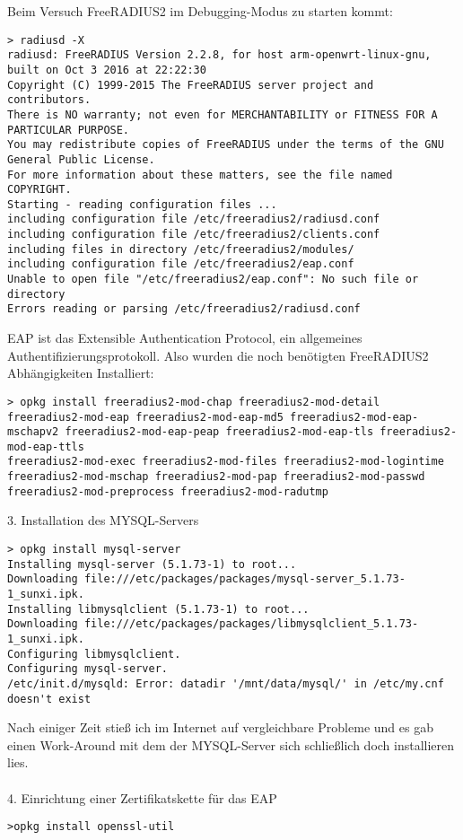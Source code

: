 Beim Versuch FreeRADIUS2 im Debugging-Modus zu starten kommt:\
\begin{lstlisting}
> radiusd -X
radiusd: FreeRADIUS Version 2.2.8, for host arm-openwrt-linux-gnu, built on Oct 3 2016 at 22:22:30
Copyright (C) 1999-2015 The FreeRADIUS server project and contributors.
There is NO warranty; not even for MERCHANTABILITY or FITNESS FOR A PARTICULAR PURPOSE.
You may redistribute copies of FreeRADIUS under the terms of the GNU General Public License.
For more information about these matters, see the file named COPYRIGHT.
Starting - reading configuration files ...
including configuration file /etc/freeradius2/radiusd.conf
including configuration file /etc/freeradius2/clients.conf
including files in directory /etc/freeradius2/modules/
including configuration file /etc/freeradius2/eap.conf
Unable to open file "/etc/freeradius2/eap.conf": No such file or directory
Errors reading or parsing /etc/freeradius2/radiusd.conf
\end{lstlisting}
EAP ist das Extensible Authentication Protocol, ein allgemeines Authentifizierungsprotokoll. Also
wurden die noch benötigten FreeRADIUS2 Abhängigkeiten Installiert:
\begin{lstlisting}
> opkg install freeradius2-mod-chap freeradius2-mod-detail freeradius2-mod-eap freeradius2-mod-eap-md5 freeradius2-mod-eap-mschapv2 freeradius2-mod-eap-peap freeradius2-mod-eap-tls freeradius2-mod-eap-ttls
freeradius2-mod-exec freeradius2-mod-files freeradius2-mod-logintime
freeradius2-mod-mschap freeradius2-mod-pap freeradius2-mod-passwd
freeradius2-mod-preprocess freeradius2-mod-radutmp
\end{lstlisting}
3. Installation des MYSQL-Servers
\begin{lstlisting}
> opkg install mysql-server
Installing mysql-server (5.1.73-1) to root...
Downloading file:///etc/packages/packages/mysql-server_5.1.73-1_sunxi.ipk.
Installing libmysqlclient (5.1.73-1) to root...
Downloading file:///etc/packages/packages/libmysqlclient_5.1.73-1_sunxi.ipk.
Configuring libmysqlclient.
Configuring mysql-server.
/etc/init.d/mysqld: Error: datadir '/mnt/data/mysql/' in /etc/my.cnf
doesn't exist
\end{lstlisting}
Nach einiger Zeit stieß ich im Internet auf vergleichbare Probleme und es gab einen Work-Around
mit dem der MYSQL-Server sich schließlich doch installieren lies.\\
~\\
4. Einrichtung einer Zertifikatskette für das EAP
\begin{lstlisting}
>opkg install openssl-util
\end{lstlisting}
